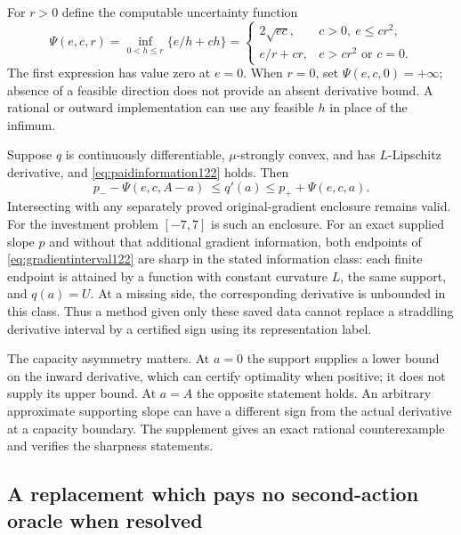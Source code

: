 For $r>0$ define the computable uncertainty function
\begin{equation}\label{eq:psi122}
 \Psi(e,c,r)=\inf_{0<h\le r}\{e/h+ch\}
 =\begin{cases}
  2\sqrt{ec},&c>0,\ e\le cr^2,\\
  e/r+cr,&e>cr^2\text{ or }c=0.
 \end{cases}
\end{equation}
The first expression has value zero at $e=0$. When $r=0$, set
$\Psi(e,c,0)=+\infty$; absence of a feasible direction does not provide
an absent derivative bound. A rational or outward implementation can use
any feasible $h$ in place of the infimum.

\begin{theorem}
\label{thm:supportgradient122}
Suppose $q$ is continuously differentiable, $\mu$-strongly convex, and has
$L$-Lipschitz derivative, and \eqref{eq:paidinformation122} holds.
Then
\begin{equation}\label{eq:gradientinterval122}
 p_- -\Psi(e,c,A-a)\ \le q'(a)\le
 p_+ +\Psi(e,c,a).
\end{equation}
Intersecting with any separately proved original-gradient enclosure remains
valid. For the investment problem $[-7,7]$ is such an enclosure.
For an exact supplied slope $p$ and without that additional gradient
information, both endpoints of \eqref{eq:gradientinterval122} are sharp
in the stated information class: each finite endpoint is attained by a
function with constant curvature $L$, the same support, and $q(a)=U$.
At a missing side, the corresponding derivative is unbounded in this class.
Thus a method given only these saved data cannot replace a straddling
derivative interval by a certified sign using its representation label.
\end{theorem}

The capacity asymmetry matters. At $a=0$ the support supplies a lower
bound on the inward derivative, which can certify optimality when positive;
it does not supply its upper bound. At $a=A$ the opposite statement holds.
An arbitrary approximate supporting slope can have a different sign from
the actual derivative at a capacity boundary. The supplement gives an
exact rational counterexample and verifies the sharpness statements.

\subsection{A replacement which pays no second-action oracle when resolved}

